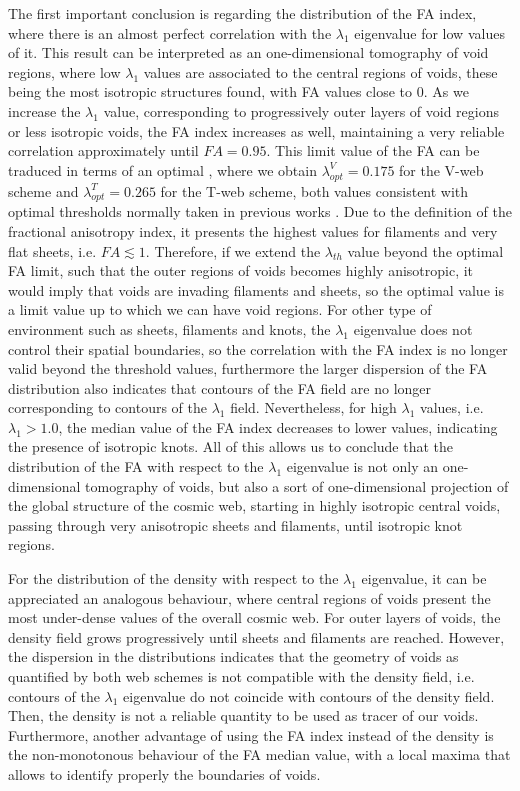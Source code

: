 \documentclass[a4,useAMS,usenatbib,usegraphicx]{latex/mn2e}
\begin{document}
The first important conclusion is regarding the distribution of the FA 
index, where there is an almost perfect correlation with the $\lambda_1$ 
eigenvalue for low values of it. This result can be interpreted as an 
one-dimensional tomography of void regions, where low $\lambda_1$ values 
are associated to the central regions of voids, these being the most 
isotropic structures found, with FA values close to 0. As we increase the 
$\lambda_1$ value, corresponding to progressively outer layers of void 
regions or less isotropic voids, the FA index increases as well, 
maintaining a very reliable correlation approximately until $FA=0.95$. 
This limit value of the FA can be traduced in terms of an optimal \lth, 
where we obtain $\lambda_{opt}^V = 0.175$ for the V-web scheme and 
$\lambda_{opt}^T = 0.265$ for the T-web scheme, both values consistent 
with optimal thresholds normally taken in previous works \SRKED{[references]}. 
Due to the definition of the fractional anisotropy index, it presents the 
highest values for filaments and very flat sheets, i.e. $FA\lesssim 1$.
Therefore, if we extend the $\lambda_{th}$ value beyond the optimal 
FA limit, such that the outer regions of voids becomes highly anisotropic, 
it would imply that voids are invading filaments and sheets, so the 
optimal \lth value is a limit value up to which we can have void regions. 
For other type of environment such as sheets, filaments and knots, the 
$\lambda_1$ eigenvalue does not control their spatial boundaries, so the 
correlation with the FA index is no longer valid beyond the threshold 
values, furthermore the larger dispersion of the FA distribution also 
indicates that contours of the FA field are no longer corresponding to 
contours of the $\lambda_1$ field. Nevertheless, for high $\lambda_1$ 
values, i.e. $\lambda_1>1.0$, the median value of the FA index decreases 
to lower values, indicating the presence of isotropic knots. All of this 
allows us to conclude that the distribution of the FA with respect to the 
$\lambda_1$ eigenvalue is not only an one-dimensional tomography of voids, 
but also a sort of one-dimensional projection of the global structure of 
the cosmic web, starting in highly isotropic central voids, passing 
through very anisotropic sheets and filaments, until isotropic knot 
regions.


For the distribution of the density with respect to the $\lambda_1$ 
eigenvalue, it can be appreciated an analogous behaviour, where central 
regions of voids present the most under-dense values of the overall cosmic 
web. For outer layers of voids, the density field grows progressively 
until sheets and filaments are reached. However, the dispersion in the 
distributions indicates that the geometry of voids as quantified by both 
web schemes is not compatible with the density field, i.e. contours of the
$\lambda_1$ eigenvalue do not coincide with contours of the density field. 
Then, the density is not a reliable quantity to be used as tracer of our 
voids. Furthermore, another advantage of using the FA index instead of the
density is the non-monotonous behaviour of the FA median value, with a 
local maxima that allows to identify properly the boundaries of voids.
\end{document}
